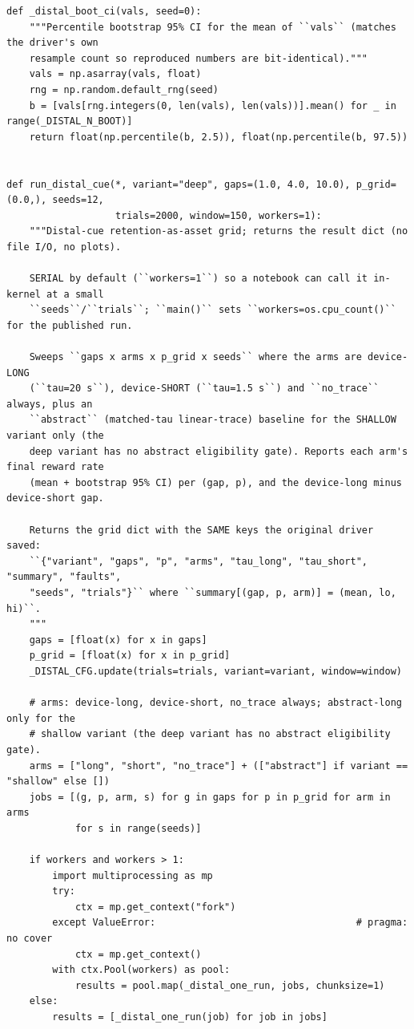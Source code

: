 \begin{lstlisting}[caption={mrl\_trace/distal\_cue.py},label={lst:siox-src-distal_cue}]
def _distal_boot_ci(vals, seed=0):
    """Percentile bootstrap 95% CI for the mean of ``vals`` (matches the driver's own
    resample count so reproduced numbers are bit-identical)."""
    vals = np.asarray(vals, float)
    rng = np.random.default_rng(seed)
    b = [vals[rng.integers(0, len(vals), len(vals))].mean() for _ in range(_DISTAL_N_BOOT)]
    return float(np.percentile(b, 2.5)), float(np.percentile(b, 97.5))


def run_distal_cue(*, variant="deep", gaps=(1.0, 4.0, 10.0), p_grid=(0.0,), seeds=12,
                   trials=2000, window=150, workers=1):
    """Distal-cue retention-as-asset grid; returns the result dict (no file I/O, no plots).

    SERIAL by default (``workers=1``) so a notebook can call it in-kernel at a small
    ``seeds``/``trials``; ``main()`` sets ``workers=os.cpu_count()`` for the published run.

    Sweeps ``gaps x arms x p_grid x seeds`` where the arms are device-LONG
    (``tau=20 s``), device-SHORT (``tau=1.5 s``) and ``no_trace`` always, plus an
    ``abstract`` (matched-tau linear-trace) baseline for the SHALLOW variant only (the
    deep variant has no abstract eligibility gate). Reports each arm's final reward rate
    (mean + bootstrap 95% CI) per (gap, p), and the device-long minus device-short gap.

    Returns the grid dict with the SAME keys the original driver saved:
    ``{"variant", "gaps", "p", "arms", "tau_long", "tau_short", "summary", "faults",
    "seeds", "trials"}`` where ``summary[(gap, p, arm)] = (mean, lo, hi)``.
    """
    gaps = [float(x) for x in gaps]
    p_grid = [float(x) for x in p_grid]
    _DISTAL_CFG.update(trials=trials, variant=variant, window=window)

    # arms: device-long, device-short, no_trace always; abstract-long only for the
    # shallow variant (the deep variant has no abstract eligibility gate).
    arms = ["long", "short", "no_trace"] + (["abstract"] if variant == "shallow" else [])
    jobs = [(g, p, arm, s) for g in gaps for p in p_grid for arm in arms
            for s in range(seeds)]

    if workers and workers > 1:
        import multiprocessing as mp
        try:
            ctx = mp.get_context("fork")
        except ValueError:                                   # pragma: no cover
            ctx = mp.get_context()
        with ctx.Pool(workers) as pool:
            results = pool.map(_distal_one_run, jobs, chunksize=1)
    else:
        results = [_distal_one_run(job) for job in jobs]


\end{lstlisting}
